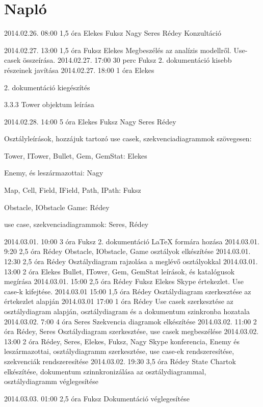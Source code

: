 %
\section{Napló}

\begin{naplo}


\bejegyzes
{2014.02.26. 08:00}
{1,5 óra}
{Elekes
Fuksz
Nagy
Seres
Rédey}
{Konzultáció}
	
\bejegyzes
{2014.02.27. 13:00}
{1,5 óra}
{Fuksz
Elekes}
{Megbeszélés az analízis modellről. Use-casek összeírása.}
\bejegyzes
{2014.02.27. 17:00}
{30 perc}
{Fuksz}
{2. dokumentáció kisebb részeinek javítása}
\bejegyzes
{2014.02.27. 18:00}
{1 óra}
{Elekes}
{2. dokumentáció kiegészítés

 3.3.3  Tower objektum leírása}
\bejegyzes
{2014.02.28. 14:00}
{5 óra}
{Elekes
Fuksz
Nagy
Seres
Rédey}
{Osztályleírások, hozzájuk tartozó use casek, szekvenciadiagrammok szövegesen:

Tower, ITower, Bullet, Gem, GemStat: Elekes

Enemy, és leszármazottai: Nagy

Map, Cell, Field, IField, Path, IPath: Fuksz

Obstacle, IObstacle Game: Rédey

use case, szekvenciadiagrammok: Seres, Rédey}
\bejegyzes
{2014.03.01. 10:00}
{3 óra}
{Fuksz}
{2. dokumentáció \LaTeX{} formára hozása}
\bejegyzes
{2014.03.01. 9:20}
{2,5 óra}
{Rédey}
{Obstacle, IObstacle, Game osztályok elkészítése}
\bejegyzes
{2014.03.01. 12:30}
{2,5 óra}
{Rédey}
{Osztálydiagram rajzolása a meglévő osztályokkal}
\bejegyzes
{2014.03.01. 13:00}
{2 óra}
{Elekes}
{Bullet, ITower, Gem, GemStat leírások, és katalógusok megírása}
\bejegyzes
{2014.03.01. 15:00}
{2,5 óra}
{Rédey
Fuksz
Elekes}
{Skype értekezlet.
Use case-k kifejtése.}
\bejegyzes
{2014.03.01 15:00}
{1,5 óra}
{Rédey}
{Osztálydiagram szerkesztése az értekezlet alapján}
\bejegyzes
{2014.03.01 17:00}
{1 óra}
{Rédey}
{Use casek szerkesztése az osztálydiagram alapján, osztálydiagram és a dokumentum szinkronba hozatala}
\bejegyzes
{2014.03.02. 7:00}
{4 óra}
{Seres}
{Szekvencia diagramok elkészítése}
\bejegyzes
{2014.03.02. 11:00}
{2 óra}
{Rédey, Seres}
{Osztálydiagram szerkesztése, use casek megbeszélése}
\bejegyzes
{2014.03.02. 13:00}
{2 óra}
{Rédey, Seres, Elekes, Fuksz, Nagy}
{Skype konferencia, Enemy és leszármazottai, osztálydiagramm szerkesztése, use case-ek rendszeresítése, szekvenciák rendszeresítése}
\bejegyzes
{2014.03.02. 19:30}
{3,5 óra}
{Rédey}
{State Chartok elkészítése, dokumentum szinnkronizálása az osztálydiagrammal, osztálydiagramm véglegesítése
}
		
\bejegyzes
{2014.03.03. 01:00}
{2,5 óra}
{Fuksz}
{Dokumentáció véglegesítése}	
		
 			
			
			
			
			
			
			

\end{naplo}

